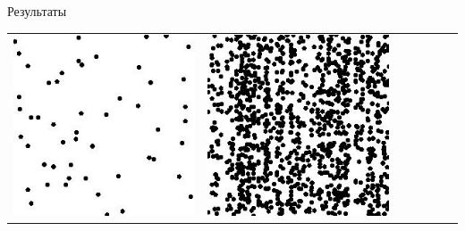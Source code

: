 \documentclass[12pt]{beamer}
\begin{document}
\begin{frame}{Результаты}
\begin{table}
\begin{center}
\begin{tabular}{p{1.2cm} p{1.2cm} p{1.2cm} p{1.2cm} p{1.2cm} p{1.2cm} p{1.2cm}}
					\includegraphics[width=1\linewidth]{8-results/sand-trend2/left3}
					&
					\includegraphics[width=1\linewidth]{8-results/sand-trend2/right3}
					&

\end{tabular}
\end{center}
\end{table}
\end{frame}
\end{document}
